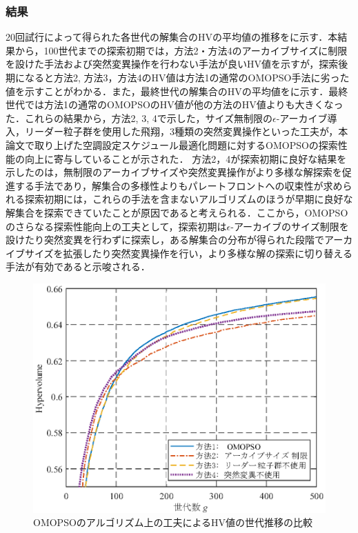 \subsubsection{結果}
20回試行によって得られた各世代の解集合のHVの平均値の推移をに示す．本結果から，100世代までの探索初期では，方法2・方法4のアーカイブサイズに制限を設けた手法および突然変異操作を行わない手法が良いHV値を示すが，探索後期になると方法2, 方法3，方法4のHV値は方法1の通常のOMOPSO手法に劣った値を示すことがわかる．また，最終世代の解集合のHVの平均値をに示す．最終世代では方法1の通常のOMOPSOのHV値が他の方法のHV値よりも大きくなった．これらの結果から，方法2, 3, 4で示した，サイズ無制限の$\epsilon$-アーカイブ導入，リーダー粒子群を使用した飛翔，3種類の突然変異操作といった工夫が，本論文で取り上げた空調設定スケジュール最適化問題に対するOMOPSOの探索性能の向上に寄与していることが示された．
方法2，4が探索初期に良好な結果を示したのは，無制限のアーカイブサイズや突然変異操作がより多様な解探索を促進する手法であり，解集合の多様性よりもパレートフロントへの収束性が求められる探索初期には，これらの手法を含まないアルゴリズムのほうが早期に良好な解集合を探索できていたことが原因であると考えられる．ここから，OMOPSOのさらなる探索性能向上の工夫として，探索初期は$\epsilon$-アーカイブのサイズ制限を設けたり突然変異を行わずに探索し，ある解集合の分布が得られた段階でアーカイブサイズを拡張したり突然変異操作を行い，より多様な解の探索に切り替える手法が有効であると示唆される．


\begin{figure}[htbp]
  \begin{center}
    \includegraphics[width=0.7\linewidth]{fig/sim_result_omopso_hv.eps}
  \end{center}
  \caption{OMOPSOのアルゴリズム上の工夫によるHV値の世代推移の比較}
  \vspace{-6mm}
  \label{fig::sim_result_omopso_hv}
\end{figure}

